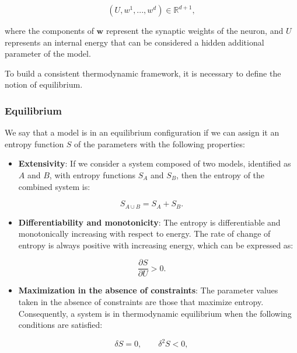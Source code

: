 \documentclass[12pt]{article}
\begin{document}
\begin{equation}
(U, w^1, ..., w^d) \in \mathbb{R}^{d+1},
\end{equation}

where the components of $\mathbf{w}$ represent the synaptic weights of the neuron, and $U$ represents an internal energy that can be considered a hidden additional parameter of the model.

To build a consistent thermodynamic framework, it is necessary to define the notion of equilibrium.

\subsubsection{Equilibrium}

We say that a model is in an equilibrium configuration if we can assign it an entropy function $S$ of the parameters with the following properties:

\begin{itemize}
\item \textbf{Extensivity}: If we consider a system composed of two models, identified as $A$ and $B$, with entropy functions $S_A$ and $S_B$, then the entropy of the combined system is:
\end{itemize}

\begin{equation}
S_{A \cup B} = S_A + S_B.
\end{equation}

\begin{itemize}
\item \textbf{Differentiability and monotonicity}: The entropy is differentiable and monotonically increasing with respect to energy. The rate of change of entropy is always positive with increasing energy, which can be expressed as:
\end{itemize}

\begin{equation}
\frac{\partial S}{\partial U} > 0.
\end{equation}

\begin{itemize}
\item \textbf{Maximization in the absence of constraints}: The parameter values taken in the absence of constraints are those that maximize entropy. Consequently, a system is in thermodynamic equilibrium when the following conditions are satisfied:
\end{itemize}

\begin{equation}
\delta S = 0, \qquad \delta^2 S < 0,
\end{equation}
\end{document}
